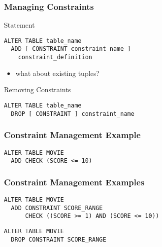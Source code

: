 \documentclass[dvipsnames]{beamer}
\theoremstyle{plain}
\begin{document}
\begin{frame}[fragile]
  \frametitle{Managing Constraints}

  \begin{block}{Statement}
    \begin{lstlisting}
ALTER TABLE table_name
  ADD [ CONSTRAINT constraint_name ]
    constraint_definition
    \end{lstlisting}
  \end{block}

  \pause
  \begin{itemize}
    \item what about existing tuples?
  \end{itemize}

  \pause
  \begin{block}{Removing Constraints}
    \begin{lstlisting}
ALTER TABLE table_name
  DROP [ CONSTRAINT ] constraint_name
    \end{lstlisting}
  \end{block}
\end{frame}

\begin{frame}[fragile]
  \frametitle{Constraint Management Example}

  \begin{example}
    \begin{lstlisting}
ALTER TABLE MOVIE
  ADD CHECK (SCORE <= 10)
    \end{lstlisting}
  \end{example}
\end{frame}

\begin{frame}[fragile]
  \frametitle{Constraint Management Examples}

  \begin{example}
    \begin{lstlisting}
ALTER TABLE MOVIE
  ADD CONSTRAINT SCORE_RANGE
      CHECK ((SCORE >= 1) AND (SCORE <= 10))
    \end{lstlisting}
  \end{example}

  \pause
  \begin{example}
    \begin{lstlisting}
ALTER TABLE MOVIE
  DROP CONSTRAINT SCORE_RANGE
    \end{lstlisting}
  \end{example}
\end{frame}
\end{document}
